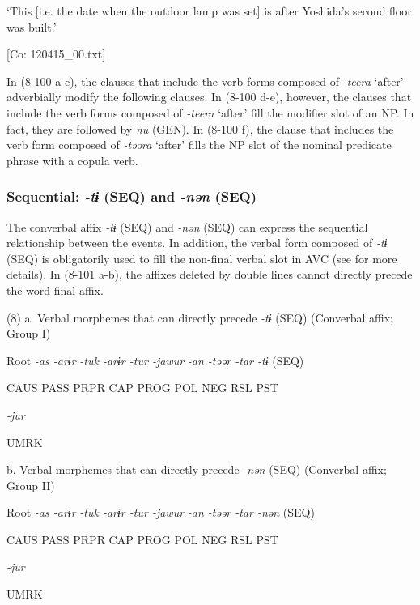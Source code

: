       ‘This [i.e. the date when the outdoor lamp was set] is after Yoshida’s second floor was built.’

      [Co: 120415\_00.txt]

In (8-100 a-c), the clauses that include the verb forms composed of \textit{{}-teera} ‘after’ adverbially modify the following clauses. In (8-100 d-e), however, the clauses that include the verb forms composed of \textit{{}-teera} ‘after’ fill the modifier slot of an NP. In fact, they are followed by \textit{nu} (GEN). In (8-100 f), the clause that includes the verb form composed of \textit{{}-təəra} ‘after’ fills the NP slot of the nominal predicate phrase with a copula verb.

\subsubsection{Sequential: \textit{{}-tɨ} (SEQ) and \textit{{}-nən} (SEQ)}

The converbal affix \textit{{}-tɨ} (SEQ) and \textit{{}-nən} (SEQ) can express the sequential relationship between the events. In addition, the verbal form composed of \textit{{}-tɨ} (SEQ) is obligatorily used to fill the non-final verbal slot in AVC (see  for more details). In (8-101 a-b), the affixes deleted by double lines cannot directly precede the word-final affix.

(8)  a. Verbal morphemes that can directly precede \textit{{}-tɨ} (SEQ) (Converbal affix; Group I)

  Root  \textit{{}-as  {}-arɨr} %
\textit{{}-tuk  {}-arɨr  {}-tur  {}-jawur} %
\textit{{}-an  {}-təər  {}-tar  {}-tɨ} (SEQ)

    CAUS  PASS  PRPR  CAP  PROG  POL  NEG  RSL  PST  

          \textit{{}-jur} 

          UMRK    

  b. Verbal morphemes that can directly precede \textit{{}-nən} (SEQ) (Converbal affix; Group II)

  Root  \textit{{}-as  {}-arɨr} %
\textit{{}-tuk  {}-arɨr  {}-tur  {}-jawur} %
\textit{{}-an  {}-təər  {}-tar  {}-nən} (SEQ)

    CAUS  PASS  PRPR  CAP  PROG  POL  NEG  RSL  PST  

          \textit{{}-jur} 

          UMRK    

